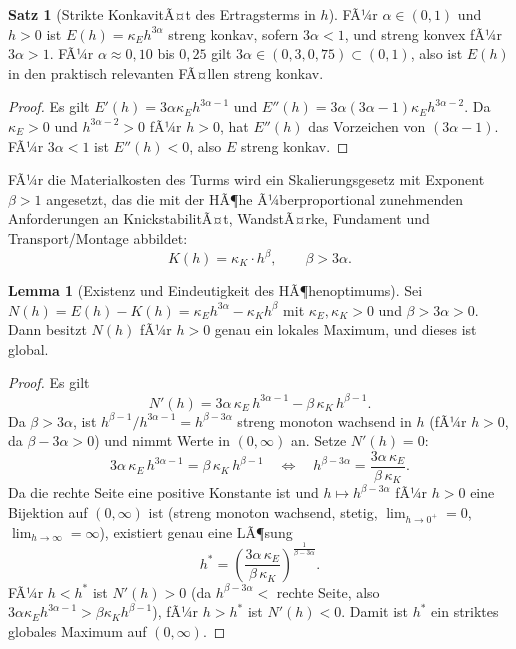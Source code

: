 ﻿\documentclass[a4paper,12pt]{article}
\theoremstyle{definition}
\newtheorem{satz}{Satz}
\newtheorem{lemma}{Lemma}
\begin{document}
\begin{satz}[Strikte KonkavitÃ¤t des Ertragsterms in $h$]
\label{satz:konkav_ertrag}
FÃ¼r $\alpha \in (0,1)$ und $h>0$ ist $E(h) = \kappa_E h^{3\alpha}$ streng konkav, sofern $3\alpha < 1$, und streng konvex fÃ¼r $3\alpha>1$. FÃ¼r $\alpha \approx 0{,}10$ bis $0{,}25$ gilt $3\alpha \in (0{,}3, 0{,}75) \subset (0,1)$, also ist $E(h)$ in den praktisch relevanten FÃ¤llen streng konkav.
\end{satz}

\begin{proof}
Es gilt $E'(h) = 3\alpha \kappa_E h^{3\alpha-1}$ und $E''(h) = 3\alpha(3\alpha-1)\kappa_E h^{3\alpha-2}$. Da $\kappa_E>0$ und $h^{3\alpha-2}>0$ fÃ¼r $h>0$, hat $E''(h)$ das Vorzeichen von $(3\alpha-1)$. FÃ¼r $3\alpha<1$ ist $E''(h)<0$, also $E$ streng konkav. \qedhere
\end{proof}

FÃ¼r die Materialkosten des Turms wird ein Skalierungsgesetz mit Exponent $\beta>1$ angesetzt, das die mit der HÃ¶he Ã¼berproportional zunehmenden Anforderungen an KnickstabilitÃ¤t, WandstÃ¤rke, Fundament und Transport/Montage abbildet:
\[
K(h) = \kappa_K \cdot h^{\beta}, \qquad \beta > 3\alpha.
\]

\begin{lemma}[Existenz und Eindeutigkeit des HÃ¶henoptimums]
\label{lem:hoehe_existenz}
Sei $N(h) = E(h) - K(h) = \kappa_E h^{3\alpha} - \kappa_K h^{\beta}$ mit $\kappa_E,\kappa_K>0$ und $\beta > 3\alpha > 0$. Dann besitzt $N(h)$ fÃ¼r $h>0$ genau ein lokales Maximum, und dieses ist global.
\end{lemma}

\begin{proof}
Es gilt
\[
N'(h) = 3\alpha\,\kappa_E\, h^{3\alpha-1} - \beta\,\kappa_K\, h^{\beta-1}.
\]
Da $\beta>3\alpha$, ist $h^{\beta-1}/h^{3\alpha-1} = h^{\beta-3\alpha}$ streng monoton wachsend in $h$ (fÃ¼r $h>0$, da $\beta-3\alpha>0$) und nimmt Werte in $(0,\infty)$ an. Setze $N'(h)=0$:
\[
3\alpha\,\kappa_E\, h^{3\alpha-1} = \beta\,\kappa_K\, h^{\beta-1}
\quad\Longleftrightarrow\quad
h^{\beta-3\alpha} = \frac{3\alpha\,\kappa_E}{\beta\,\kappa_K}.
\]
Da die rechte Seite eine positive Konstante ist und $h \mapsto h^{\beta-3\alpha}$ fÃ¼r $h>0$ eine Bijektion auf $(0,\infty)$ ist (streng monoton wachsend, stetig, $\lim_{h\to0^+}=0$, $\lim_{h\to\infty}=\infty$), existiert genau eine LÃ¶sung
\[
h^* = \left(\frac{3\alpha\,\kappa_E}{\beta\,\kappa_K}\right)^{\frac{1}{\beta-3\alpha}}.
\]
FÃ¼r $h<h^*$ ist $N'(h)>0$ (da $h^{\beta-3\alpha} < $ rechte Seite, also $3\alpha\kappa_E h^{3\alpha-1} > \beta\kappa_K h^{\beta-1}$), fÃ¼r $h>h^*$ ist $N'(h)<0$. Damit ist $h^*$ ein striktes globales Maximum auf $(0,\infty)$. \qedhere
\end{proof}
\end{document}
